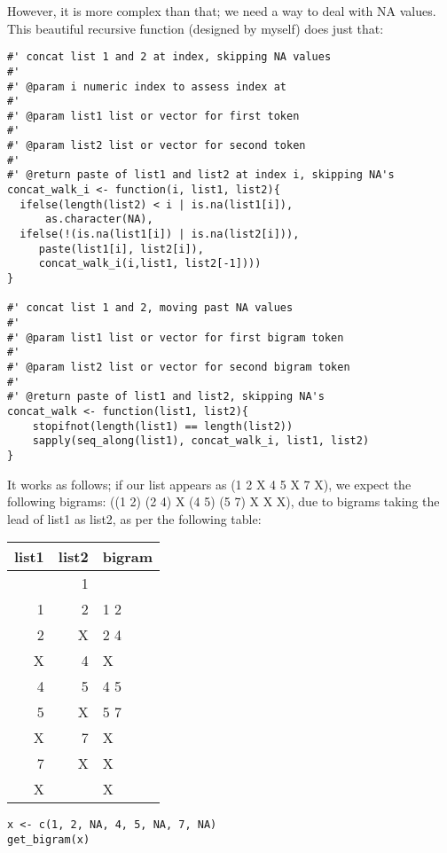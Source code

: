 \documentclass[a4paper, 11pt]{article}
\begin{document}
However, it is more complex than that; we need a way to deal with NA
values. This beautiful recursive function (designed by myself) does
just that:

\begin{verbatim}
#' concat list 1 and 2 at index, skipping NA values
#'
#' @param i numeric index to assess index at
#'
#' @param list1 list or vector for first token
#'
#' @param list2 list or vector for second token
#'
#' @return paste of list1 and list2 at index i, skipping NA's
concat_walk_i <- function(i, list1, list2){
  ifelse(length(list2) < i | is.na(list1[i]),
	  as.character(NA),
  ifelse(!(is.na(list1[i]) | is.na(list2[i])),
	 paste(list1[i], list2[i]),
	 concat_walk_i(i,list1, list2[-1])))
}

#' concat list 1 and 2, moving past NA values
#'
#' @param list1 list or vector for first bigram token
#'
#' @param list2 list or vector for second bigram token
#'
#' @return paste of list1 and list2, skipping NA's
concat_walk <- function(list1, list2){
    stopifnot(length(list1) == length(list2))
    sapply(seq_along(list1), concat_walk_i, list1, list2)
}  
\end{verbatim}

It works as follows; if our list appears as (1 2 X 4 5 X 7 X), we
expect the following bigrams: ((1 2) (2 4) X (4 5) (5 7) X X X), due
to bigrams taking the lead of list1 as list2, as per the following
table:

\begin{center}
\begin{tabular}{rrl}
list1 & list2 & bigram\\
\hline
 & 1 & \\
1 & 2 & 1 2\\
2 & X & 2 4\\
X & 4 & X\\
4 & 5 & 4 5\\
5 & X & 5 7\\
X & 7 & X\\
7 & X & X\\
X &  & X\\
\end{tabular}
\end{center}

\begin{verbatim}
x <- c(1, 2, NA, 4, 5, NA, 7, NA)
get_bigram(x)
\end{verbatim}
\end{document}

